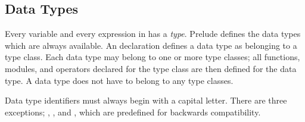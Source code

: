 




\subsection{Data Types}
\label{prelude-datatypes}


Every variable and every expression in {\BSV}  has a \emph{type}.
Prelude defines the data types which are always available.
An  declaration defines a  data type as belonging to  a 
type class. 
Each data type may belong to one or more type classes; all functions, modules,
and  operators declared for the type class are then 
defined for the data type.   A data type does not have to belong to any
 type classes.

Data type identifiers must always begin with a capital letter.  There
are three exceptions; , , and ,  which are
predefined for backwards compatibility.



